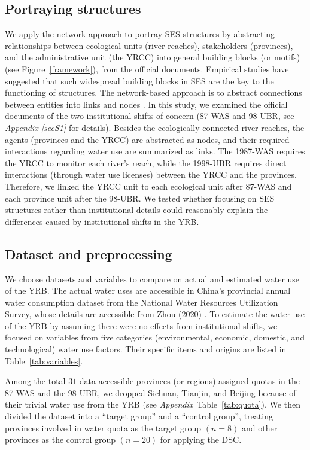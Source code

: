 \documentclass[default, sn-standardnature]{sn-jnl}
\begin{document}
\subsection{Portraying structures}\label{sec:structures}
We apply the network \cite{bodin2017b} approach to portray SES structures by abstracting relationships between ecological units (river reaches), stakeholders (provinces), and the administrative unit (the YRCC) into general building blocks (or motifs) (see Figure~\ref{framework}), from the official documents.
Empirical studies have suggested that such widespread building blocks in SES are the key to the functioning of structures. The network-based approach is to abstract connections between entities into links and nodes \cite{bodin2017a,kluger2020,guerrero2015}.
In this study, we examined the official documents of the two institutional shifts of concern (87-WAS and 98-UBR, see \textit{Appendix \ref{secS1}} for details).
Besides the ecologically connected river reaches, the agents (provinces and the YRCC) are abstracted as nodes, and their required interactions regarding water use are summarized as links.
The 1987-WAS requires the YRCC to monitor each river's reach, while the 1998-UBR requires direct interactions (through water use licenses) between the YRCC and the provinces.
Therefore, we linked the YRCC unit to each ecological unit after 87-WAS and each province unit after the 98-UBR.
We tested whether focusing on SES structures rather than institutional details could reasonably explain the differences caused by institutional shifts in the YRB.

\subsection{Dataset and preprocessing}\label{sec:dataset}
We choose datasets and variables to compare on actual and estimated water use of the YRB.
The actual water uses are accessible in China’s provincial annual water consumption dataset from the National Water Resources Utilization Survey, whose details are accessible from Zhou (2020) \cite{zhou2020}.
To estimate the water use of the YRB by assuming there were no effects from institutional shifts, we focused on variables from five categories (environmental, economic, domestic, and technological) water use factors. Their specific items and origins are listed in Table~\ref{tab:variables}.

Among the total $31$ data-accessible provinces (or regions) assigned quotas in the 87-WAS and the 98-UBR, we dropped Sichuan, Tianjin, and Beijing because of their trivial water use from the YRB (see \textit{Appendix}~Table~\ref{tab:quota}). We then divided the dataset into a ``target group'' and a ``control group'', treating provinces involved in water quota as the target group $(n=8)$ and other provinces as the control group $(n=20)$ for applying the DSC.
\end{document}
